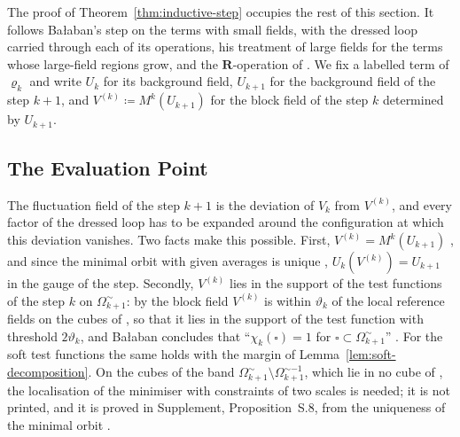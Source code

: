 \documentclass[11pt]{preprint}
\numberwithin{equation}{section}
\theoremstyle{definition}
\theoremstyle{remark}
\theoremstyle{plain}
\begin{document}
The proof of Theorem~\ref{thm:inductive-step} occupies the rest of this section. It follows Ba{\l}aban's step \cite[Sect.~3]{BalabanCRE} on the terms with small fields, with the dressed loop carried through each of its operations, his treatment of large fields \cite[Sect.~1]{BalabanLFR2} for the terms whose large-field regions grow, and the $\mathbf R$-operation of \cite{BalabanLFR1,BalabanLFR2}. We fix a labelled term of $\varrho_k$ and write $U_k$ for its background field, $U_{k+1}$ for the background field of the step $k + 1$, and $V^{(k)} \coloneqq M^k(U_{k+1})$ for the block field of the step $k$ determined by $U_{k+1}$.

\subsection{The Evaluation Point}\label{sec:evaluation-point}

The fluctuation field of the step $k + 1$ is the deviation of $V_k$ from $V^{(k)}$, and every factor of the dressed loop has to be expanded around the configuration at which this deviation vanishes. Two facts make this possible. First, $V^{(k)} = M^k(U_{k+1})$ \cite[(2.3), p.~265]{BalabanRG1}, and since the minimal orbit with given averages is unique \cite[p.~256]{BalabanCRE}, $U_k(V^{(k)}) = U_{k+1}$ in the gauge of the step. Secondly, $V^{(k)}$ lies in the support of the test functions of the step $k$ on $\Omega_{k+1}^{\sim}$: by \cite[(3.19), p.~268]{BalabanCRE} the block field $V^{(k)}$ is within $\vartheta_k$ of the local reference fields on the cubes of \cite[(3.16)]{BalabanCRE}, so that it lies in the support of the test function \cite[(3.3), p.~265]{BalabanCRE} with threshold $2\vartheta_k$, and Ba{\l}aban concludes that ``$\chi_k(\square) = 1$ for $\square \subset \Omega_{k+1}^{\sim}$'' \cite[p.~266]{BalabanCRE}. For the soft test functions the same holds with the margin of Lemma~\ref{lem:soft-decomposition}. On the cubes of the band $\Omega^{\sim}_{k+1} \setminus \Omega^{\sim-1}_{k+1}$, which lie in no cube of \cite[(3.16)]{BalabanCRE}, the localisation of the minimiser with constraints of two scales is needed; it is not printed, and it is proved in Supplement, Proposition~S.8, from the uniqueness of the minimal orbit \cite[Theorem~1]{BalabanVAR}.
\end{document}
